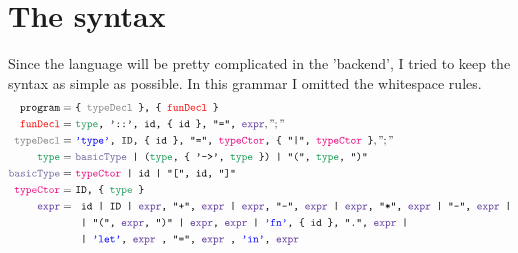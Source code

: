 \documentclass{article}
\begin{document}
\section{The syntax}
Since the language will be pretty complicated in the 'backend', I tried to keep the syntax as simple as possible. In this grammar I omitted the whitespace rules.
\begin{align*}
\texttt{program}  =\ & \texttt{\{ \color{gray}typeDecl \color{black} \}, \{ \color{red}funDecl \color{black} \}}\\
\texttt{\color{red}funDecl\color{black}} =\ & \texttt{\color{ForestGreen}type\color{black}, '::', id, \{ id \}, "=", \color{RoyalPurple}expr\color{black}}, ";"\\
\texttt{\color{gray}typeDecl\color{black}} =\ &\texttt{\color{blue}'type'\color{black}, ID, \{ id \}, "=", \color{RubineRed}typeCtor\color{black}, \{ "|", \color{RubineRed}typeCtor \color{black} \}}, ";"\\
\texttt{\color{ForestGreen}type\color{black}} =\ &\texttt{\color{CadetBlue}basicType \color{black} | (\color{ForestGreen}type\color{black}, \{ '->', \color{ForestGreen}type \color{black} \}) | "(", \color{ForestGreen}type\color{black}, ")"}\\
\texttt{\color{CadetBlue}basicType} =\ &	\texttt{\color{RubineRed}typeCtor \color{black}| id | "[", id, "]"}\\
\texttt{\color{RubineRed}typeCtor\color{black}} =\ & \texttt{ID, \{ \color{ForestGreen}type \color{black} \}}\\
\texttt{\color{RoyalPurple}expr\color{black}} =\ &  \texttt{
	id
	| ID
	| \color{RoyalPurple}expr\color{black}, "+", \color{RoyalPurple}expr \color{black} 
	| \color{RoyalPurple}expr\color{black}, "-", \color{RoyalPurple}expr \color{black} 
	| \color{RoyalPurple}expr\color{black}, "*", \color{RoyalPurple}expr \color{black}
	| "-", \color{RoyalPurple}expr \color{black}
|}\\
&\texttt{
	| "(", \color{RoyalPurple}expr\color{black}, ")" 
	| \color{RoyalPurple}expr\color{black}, \color{RoyalPurple}expr \color{black} 
	| \color{blue}'fn'\color{black}, \{ id \}, ".", \color{RoyalPurple}expr \color{black} 
|}\\
&\texttt{
	| \color{blue}'let'\color{black}, 
	\color{RoyalPurple}expr \color{black}, "=",	\color{RoyalPurple}expr \color{black},	 \color{blue}'in'\color{black}, \color{RoyalPurple}expr \color{black} 
}
\end{align*}
\end{document}
